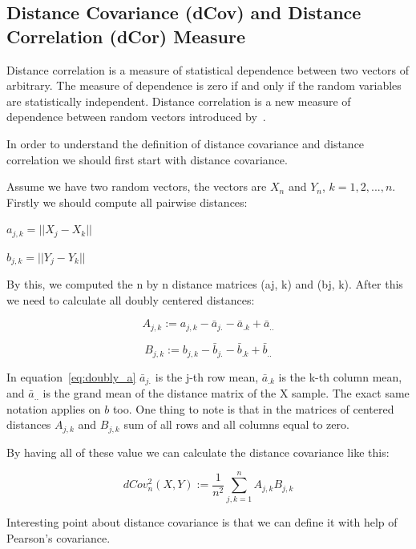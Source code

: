 \subsection{Distance Covariance (dCov) and Distance Correlation  (dCor) Measure}
\label{sec:dcov-dcor}
Distance correlation is a measure of statistical dependence between two vectors of arbitrary. The measure of dependence is zero if and only if the random variables are statistically independent. Distance correlation is a new measure of dependence between random vectors introduced by~\cite{Szekely2009}.

In order to understand the definition of distance covariance and distance correlation we should first start with distance covariance.

Assume we have two random vectors, the vectors are $X_n$ and $Y_n$, $k=1,2,...,n$. Firstly we should compute all pairwise distances:

$a_{j,k} = ||X_j - X_k||$

$b_{j,k} = ||Y_j - Y_k||$

By this, we computed the n by n distance matrices (aj, k) and (bj, k). After this we need to calculate all doubly centered distances:

\begin{equation}
\label{eq:doubly_a}
A_{j,k} := a_{j,k} - \bar{a}_{j.} - \bar{a}_{.k} + \bar{a}_{..}
\end{equation}

\begin{equation}
\label{eq:doubly_b}
B_{j,k} := b_{j,k} - \bar{b}_{j.} - \bar{b}_{.k} + \bar{b}_{..}
\end{equation}

In equation~\ref{eq:doubly_a} $\bar{a}_{j.}$ is the j-th row mean, $\bar{a}_{.k}$ is the k-th column mean, and $\bar{a}_{..}$ is the grand mean of the distance matrix of the X sample. The exact same notation applies on $b$ too. One thing to note is that in the matrices of centered distances $A_{j, k}$ and $B_{j,k}$  sum of all rows and all columns equal to zero.

By having all of these value we can calculate the distance covariance like this:

\begin{equation}
\label{eq:distance_covariance}
dCov_n^2 (X, Y) := \frac{1}{n^2} \sum_{j,k=1}^{n} A_{j,k}B_{j,k}
\end{equation}

Interesting point about distance covariance is that we can define it with help of Pearson’s covariance.




